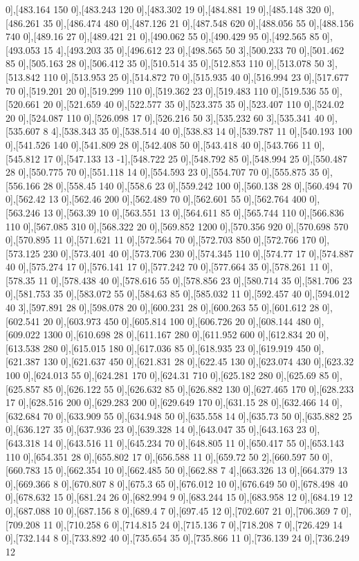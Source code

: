 {0],[483.164 150 0],[483.243 120 0],[483.302 19 0],[484.881 19 0],[485.148 320 0],[486.261 35 0],[486.474 480 0],[487.126 21 0],[487.548 620 0],[488.056 55 0],[488.156 740 0],[489.16 27 0],[489.421 21 0],[490.062 55 0],[490.429 95 0],[492.565 85 0],[493.053 15 4],[493.203 35 0],[496.612 23 0],[498.565 50 3],[500.233 70 0],[501.462 85 0],[505.163 28 0],[506.412 35 0],[510.514 35 0],[512.853 110 0],[513.078 50 3],[513.842 110 0],[513.953 25 0],[514.872 70 0],[515.935 40 0],[516.994 23 0],[517.677 70 0],[519.201 20 0],[519.299 110 0],[519.362 23 0],[519.483 110 0],[519.536 55 0],[520.661 20 0],[521.659 40 0],[522.577 35 0],[523.375 35 0],[523.407 110 0],[524.02 20 0],[524.087 110 0],[526.098 17 0],[526.216 50 3],[535.232 60 3],[535.341 40 0],[535.607 8 4],[538.343 35 0],[538.514 40 0],[538.83 14 0],[539.787 11 0],[540.193 100 0],[541.526 140 0],[541.809 28 0],[542.408 50 0],[543.418 40 0],[543.766 11 0],[545.812 17 0],[547.133 13 -1],[548.722 25 0],[548.792 85 0],[548.994 25 0],[550.487 28 0],[550.775 70 0],[551.118 14 0],[554.593 23 0],[554.707 70 0],[555.875 35 0],[556.166 28 0],[558.45 140 0],[558.6 23 0],[559.242 100 0],[560.138 28 0],[560.494 70 0],[562.42 13 0],[562.46 200 0],[562.489 70 0],[562.601 55 0],[562.764 400 0],[563.246 13 0],[563.39 10 0],[563.551 13 0],[564.611 85 0],[565.744 110 0],[566.836 110 0],[567.085 310 0],[568.322 20 0],[569.852 1200 0],[570.356 920 0],[570.698 570 0],[570.895 11 0],[571.621 11 0],[572.564 70 0],[572.703 850 0],[572.766 170 0],[573.125 230 0],[573.401 40 0],[573.706 230 0],[574.345 110 0],[574.77 17 0],[574.887 40 0],[575.274 17 0],[576.141 17 0],[577.242 70 0],[577.664 35 0],[578.261 11 0],[578.35 11 0],[578.438 40 0],[578.616 55 0],[578.856 23 0],[580.714 35 0],[581.706 23 0],[581.753 35 0],[583.072 55 0],[584.63 85 0],[585.032 11 0],[592.457 40 0],[594.012 40 3],[597.891 28 0],[598.078 20 0],[600.231 28 0],[600.263 55 0],[601.612 28 0],[602.541 20 0],[603.973 450 0],[605.814 100 0],[606.726 20 0],[608.144 480 0],[609.022 1300 0],[610.698 28 0],[611.167 280 0],[611.952 600 0],[612.834 20 0],[613.538 280 0],[615.015 180 0],[617.036 85 0],[618.935 23 0],[619.919 450 0],[621.387 130 0],[621.637 450 0],[621.831 28 0],[622.45 130 0],[623.074 430 0],[623.32 100 0],[624.013 55 0],[624.281 170 0],[624.31 710 0],[625.182 280 0],[625.69 85 0],[625.857 85 0],[626.122 55 0],[626.632 85 0],[626.882 130 0],[627.465 170 0],[628.233 17 0],[628.516 200 0],[629.283 200 0],[629.649 170 0],[631.15 28 0],[632.466 14 0],[632.684 70 0],[633.909 55 0],[634.948 50 0],[635.558 14 0],[635.73 50 0],[635.882 25 0],[636.127 35 0],[637.936 23 0],[639.328 14 0],[643.047 35 0],[643.163 23 0],[643.318 14 0],[643.516 11 0],[645.234 70 0],[648.805 11 0],[650.417 55 0],[653.143 110 0],[654.351 28 0],[655.802 17 0],[656.588 11 0],[659.72 50 2],[660.597 50 0],[660.783 15 0],[662.354 10 0],[662.485 50 0],[662.88 7 4],[663.326 13 0],[664.379 13 0],[669.366 8 0],[670.807 8 0],[675.3 65 0],[676.012 10 0],[676.649 50 0],[678.498 40 0],[678.632 15 0],[681.24 26 0],[682.994 9 0],[683.244 15 0],[683.958 12 0],[684.19 12 0],[687.088 10 0],[687.156 8 0],[689.4 7 0],[697.45 12 0],[702.607 21 0],[706.369 7 0],[709.208 11 0],[710.258 6 0],[714.815 24 0],[715.136 7 0],[718.208 7 0],[726.429 14 0],[732.144 8 0],[733.892 40 0],[735.654 35 0],[735.866 11 0],[736.139 24 0],[736.249 12 }
